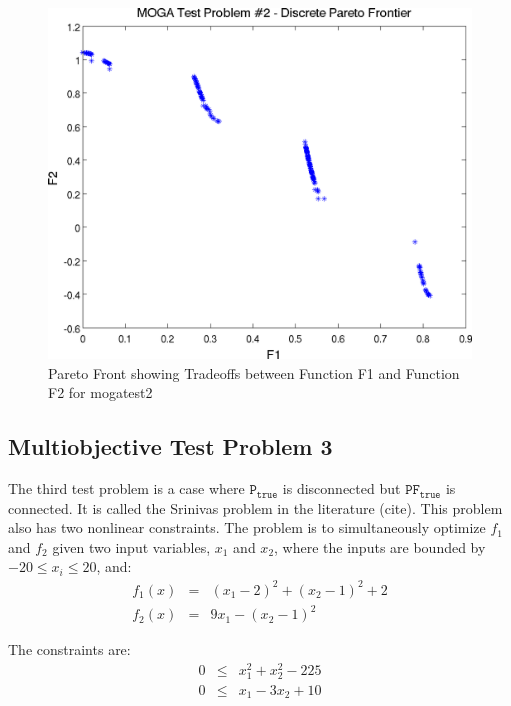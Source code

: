 \begin{figure}
  \centering
  \includegraphics[scale=0.75]{images/dakota_mogatest2_pareto_front}
  \caption{Pareto Front showing Tradeoffs between Function F1 and
    Function F2 for mogatest2}
  \label{additional:moga2front}
\end{figure}

\subsection{Multiobjective Test Problem 3}\label{additional:multiobjective:problem3}

The third test problem is a case where $\mathtt{P_{true}}$ is
disconnected but $\mathtt{PF_{true}}$ is connected.  It is called the
Srinivas problem in the literature (cite).  This problem also has two
nonlinear constraints.  The problem is to simultaneously optimize
$f_1$ and $f_2$ given two input variables, $x_1$ and $x_2$,
where the inputs are bounded by $-20 \leq x_{i} \leq 20$, and:
\begin{eqnarray*}
f_1(x) &=& (x_1-2)^2+(x_2-1)^2+2 \\
f_2(x) &=& 9x_1-(x_2-1)^2
\end{eqnarray*}

The constraints are:
\begin{eqnarray*}
0 &\leq& x_1^2+x_2^2-225 \\
0 &\leq& x_1-3x_2+10
\end{eqnarray*}

